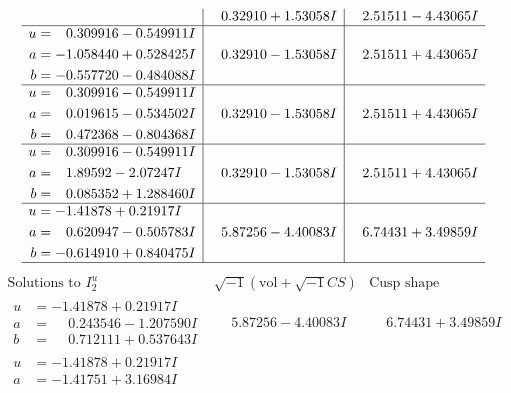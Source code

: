 \documentclass[1p]{elsarticle_modified}
\theoremstyle{definition}
\newcommand{\I}{\sqrt{-1}}
\begin{document}
$$\begin{array}{c|c|c}
 & \phantom{-}0.32910 + 1.53058 I & \phantom{-}2.51511 - 4.43065 I \\ \hline\begin{aligned}
u &= \phantom{-}0.309916 - 0.549911 I \\
a &= -1.058440 + 0.528425 I \\
b &= -0.557720 - 0.484088 I\end{aligned}
 & \phantom{-}0.32910 - 1.53058 I & \phantom{-}2.51511 + 4.43065 I \\ \hline\begin{aligned}
u &= \phantom{-}0.309916 - 0.549911 I \\
a &= \phantom{-}0.019615 - 0.534502 I \\
b &= \phantom{-}0.472368 - 0.804368 I\end{aligned}
 & \phantom{-}0.32910 - 1.53058 I & \phantom{-}2.51511 + 4.43065 I \\ \hline\begin{aligned}
u &= \phantom{-}0.309916 - 0.549911 I \\
a &= \phantom{-}1.89592 - 2.07247 I \\
b &= \phantom{-}0.085352 + 1.288460 I\end{aligned}
 & \phantom{-}0.32910 - 1.53058 I & \phantom{-}2.51511 + 4.43065 I \\ \hline\begin{aligned}
u &= -1.41878 + 0.21917 I \\
a &= \phantom{-}0.620947 - 0.505783 I \\
b &= -0.614910 + 0.840475 I\end{aligned}
 & \phantom{-}5.87256 - 4.40083 I & \phantom{-}6.74431 + 3.49859 I\\
 \hline 
 \end{array}$$\newpage$$\begin{array}{c|c|c}  
\text{Solutions to }I^u_{2}& \I (\text{vol} + \sqrt{-1}CS) & \text{Cusp shape}\\
 \hline 
\begin{aligned}
u &= -1.41878 + 0.21917 I \\
a &= \phantom{-}0.243546 - 1.207590 I \\
b &= \phantom{-}0.712111 + 0.537643 I\end{aligned}
 & \phantom{-}5.87256 - 4.40083 I & \phantom{-}6.74431 + 3.49859 I \\ \hline\begin{aligned}
u &= -1.41878 + 0.21917 I \\
a &= -1.41751 + 3.16984 I \\

\end{aligned}
\end{array}$$
\end{document}
